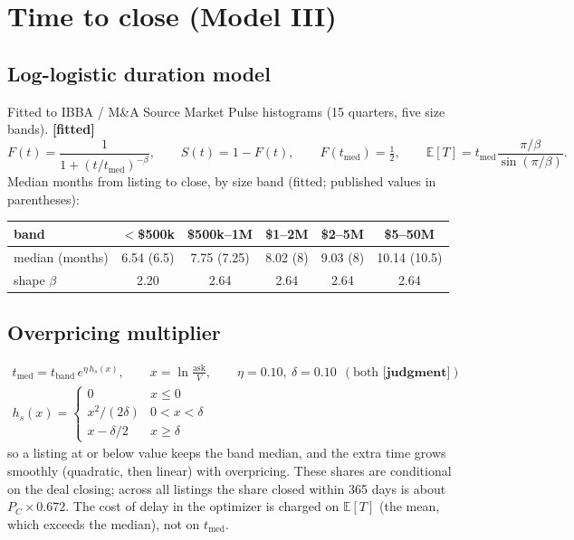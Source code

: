 \documentclass[11pt]{article}
\newcommand{\EV}[1]{\mathbb{E}\!\left[#1\right]}
\newcommand{\fit}{\textbf{[fitted]}}
\newcommand{\jud}{\textbf{[judgment]}}
\begin{document}
\section{Time to close (Model III)}
\subsection{Log-logistic duration model}
Fitted to IBBA / M\&A Source Market Pulse histograms (15 quarters, five size bands). \fit
\begin{equation}
F(t)=\frac{1}{1+(t/t_{\text{med}})^{-\beta}},\qquad S(t)=1-F(t),\qquad F(t_{\text{med}})=\tfrac12,\qquad \EV{T}=t_{\text{med}}\frac{\pi/\beta}{\sin(\pi/\beta)}.
\end{equation}
Median months from listing to close, by size band (fitted; published values in parentheses):
\begin{center}\small\begin{tabular}{lccccc}\toprule
band & $<$\$500k & \$500k--1M & \$1--2M & \$2--5M & \$5--50M\\\midrule
median (months) & 6.54 (6.5) & 7.75 (7.25) & 8.02 (8) & 9.03 (8) & 10.14 (10.5)\\
shape $\beta$ & 2.20 & 2.64 & 2.64 & 2.64 & 2.64\\\bottomrule\end{tabular}\end{center}
\subsection{Overpricing multiplier}
\begin{equation}
\begin{gathered}t_{\text{med}}=t_{\text{band}}\,e^{\eta\,h_s(x)},\qquad x=\ln\tfrac{\text{ask}}{V},\qquad \eta=0.10,\ \delta=0.10\ \ (\text{both }\jud)\\ h_s(x)=\begin{cases}0&x\le0\\ x^2/(2\delta)&0<x<\delta\\ x-\delta/2&x\ge\delta\end{cases}\end{gathered}
\end{equation}
so a listing at or below value keeps the band median, and the extra time grows smoothly (quadratic, then linear) with overpricing. These shares are conditional on the deal closing; across all listings the share closed within 365 days is about $P_C\times0.672$. The cost of delay in the optimizer is charged on $\EV{T}$ (the mean, which exceeds the median), not on $t_{\text{med}}$.
\end{document}

